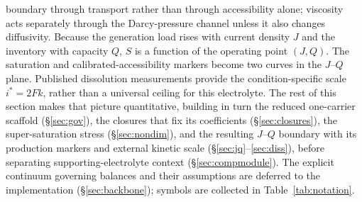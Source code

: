 \documentclass[11pt]{article}
\begin{document}
boundary through transport rather than through accessibility alone; viscosity acts separately through the
Darcy-pressure channel unless it also changes diffusivity. Because the generation load rises with current density
$J$ and the inventory with capacity $Q$, $S$ is a function of the operating point $(J,Q)$. The saturation and
calibrated-accessibility markers become two curves in the $J$--$Q$ plane. Published dissolution measurements
provide the condition-specific scale $i^{*}=2Fk$, rather than a universal ceiling for this electrolyte. The rest of this
section makes that picture quantitative, building in turn the reduced one-carrier scaffold (\S\ref{sec:gov}),
the closures that fix its coefficients (\S\ref{sec:closures}), the super-saturation stress (\S\ref{sec:nondim}),
and the resulting $J$--$Q$ boundary with its production markers and external kinetic scale
(\S\ref{sec:jq}--\ref{sec:diss}), before separating supporting-electrolyte context (\S\ref{sec:compmodule}).
The explicit continuum governing balances and their assumptions are deferred
to the implementation (\S\ref{sec:backbone}); symbols are collected in Table~\ref{tab:notation}.
\end{document}

